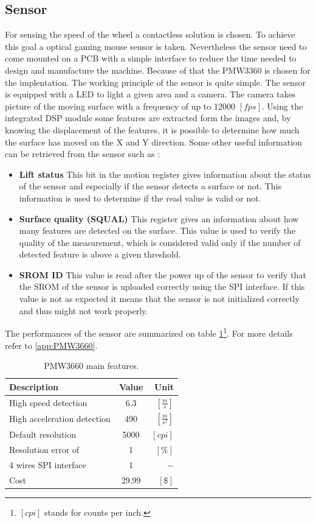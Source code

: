 \documentclass[12pt,a4paper]{article}
\begin{document}
\subsection{Sensor}
For sensing the speed of the wheel a contactless solution is chosen. To achieve this goal a optical gaming mouse sensor is taken. Nevertheless the sensor need to come mounted on a PCB with a simple interface to reduce the time needed to design and manufacture the machine.
Because of that the PMW3360 is chosen for the implentation.
The working principle of the sensor is quite simple. The sensor is equipped with a LED to light a given area and a camera. The camera takes picture of the moving surface with a frequency of up to 12000 $[fps]$. Using the integrated DSP module some features are extracted form the images and, by knowing the displacement of the features, it is possible to determine how much the surface has moved on the X and Y direction.
Some other useful information can be retrieved from the sensor such as :
\begin{itemize}
	\item \textbf{Lift status} This bit in the motion register gives information about the status of the sensor and especially if the sensor detects a surface or not. This information is used to determine if the read value is valid or not.
	\item \textbf{Surface quality (SQUAL)} This register gives an information about how many features are detected on the surface. This value is used to verify the quality of the measurement, which is considered valid only if the number of detected feature is above a given threshold.
	\item \textbf{SROM ID} This value is read after the power up of the sensor to verify that the SROM of the sensor is uploaded correctly using the SPI interface. If this value is not as expected it means that the sensor is not initialized correctly and thus might not work properly. 
\end{itemize}
The performances of the sensor are summarized on table \ref{tab:PMW3360}\footnote{$[cpi]$ stands for counts per inch.}. For more details refer to \ref{app:PMW3660}.
\begin{table}[H]
	\centering
	\begin{tabular}{l||c|r} 
		\textbf{Description}&\textbf{Value}  &\textbf{Unit}  \\ 
		\hline
		\hline 
		High speed detection & 6.3 & $[\frac{m}{s}]$ \\ 
		\hline 
		High acceleration detection & 490  & $[\frac{m}{s^2}]$  \\ 
		\hline 
		Default resolution & 5000 & $[cpi]$ \\ 
		\hline 
		Resolution error of & 1 & $[\%]$  \\ 
		\hline 
		4 wires SPI interface & 1 & $-$  \\ 
		\hline
		Cost & 29.99 &$[\$]$
	\end{tabular} 
	\caption{PMW3660 main features.}
	\label{tab:PMW3360}
\end{table}
\end{document}
